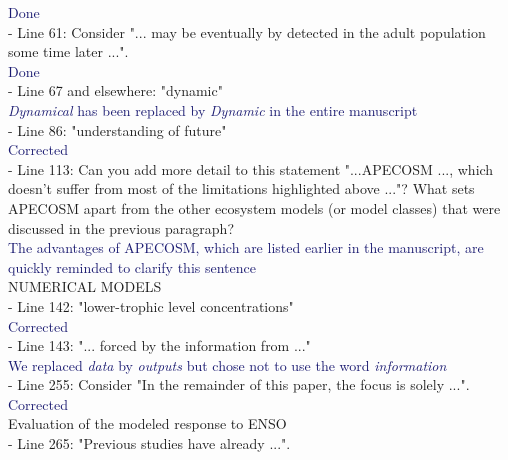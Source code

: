 \documentclass[12pt]{article}
\newcommand{\resp}[1]{\textcolor{MidnightBlue}{#1}}
\begin{document}
\resp{Done}\\

- Line 61: Consider "... may be eventually by detected in the adult population some time later ...".\\

\resp{Done}   \\

- Line 67 and elsewhere: "dynamic"\\

\resp{\emph{Dynamical} has been replaced by \emph{Dynamic} in the entire manuscript} \\

- Line 86: "understanding of future" \\

\resp{Corrected} \\

- Line 113: Can you add more detail to this statement "...APECOSM ..., which doesn't suffer from most of the limitations highlighted above ..."? What sets APECOSM apart from the other ecosystem models (or model classes) that were discussed in the previous paragraph?\\

\resp{The advantages of APECOSM, which are listed earlier in the manuscript, are quickly reminded to clarify this sentence}\\

NUMERICAL MODELS\\

- Line 142: "lower-trophic level concentrations"\\

\resp{Corrected}\\

- Line 143: "... forced by the information from ..."\\

\resp{We replaced \emph{data} by \emph{outputs} but chose not to use the word \emph{information}}\\

- Line 255: Consider "In the remainder of this paper, the focus is solely ...".\\

\resp{Corrected}\\

Evaluation of the modeled response to ENSO\\

- Line 265: "Previous studies have already ...".\\
\end{document}
